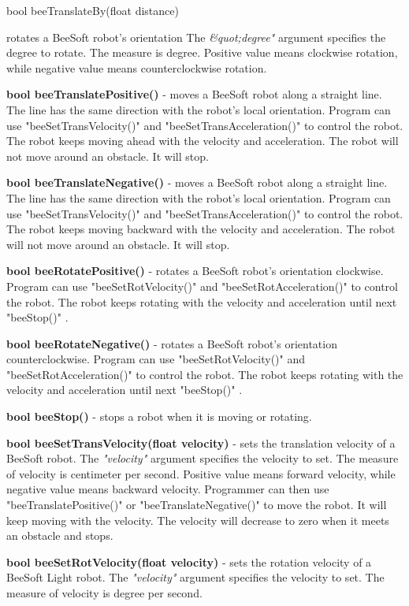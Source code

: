 {\begin{enumerate}{\bf \item bool
    beeTranslateBy(float distance)}
  rotates a BeeSoft robot's orientation The {\it \&quot;degree"}
  argument specifies the degree to rotate. The measure is degree.
  Positive value means clockwise rotation, while negative value means
  counterclockwise rotation.\item {\bf bool beeTranslatePositive()} -
  moves a BeeSoft robot along a straight line.  The line has the same
  direction with the robot's local orientation. Program can use
  "beeSetTransVelocity()" and "beeSetTransAcceleration()" to control
  the robot. The robot keeps moving ahead with the velocity and
  acceleration. The robot will not move around an obstacle. It will
  stop.\item {\bf bool beeTranslateNegative()} - moves a BeeSoft robot
  along a straight line.  The line has the same direction with the
  robot's local orientation. Program can use "beeSetTransVelocity()"
  and "beeSetTransAcceleration()" to control the robot. The robot
  keeps moving backward with the velocity and acceleration. The robot
  will not move around an obstacle. It will stop.\item {\bf bool
    beeRotatePositive()} - rotates a BeeSoft robot's orientation
  clockwise. Program can use "beeSetRotVelocity()" and
  "beeSetRotAcceleration()" to control the robot. The robot keeps
  rotating with the velocity and acceleration until next "beeStop()"
  .\item {\bf bool beeRotateNegative()} - rotates a BeeSoft robot's
  orientation counterclockwise. Program can use "beeSetRotVelocity()"
  and "beeSetRotAcceleration()" to control the robot. The robot keeps
  rotating with the velocity and acceleration until next "beeStop()"
  .\item {\bf bool beeStop()} - stops a robot when it is moving or
  rotating.\item {\bf bool beeSetTransVelocity(float velocity)} - sets
  the translation velocity of a BeeSoft robot.  The {\it "velocity"}
  argument specifies the velocity to set. The measure of velocity is
  centimeter per second. Positive value means forward velocity, while
  negative value means backward velocity. Programmer can then use
  "beeTranslatePositive()" or "beeTranslateNegative()" to move the
  robot. It will keep moving with the velocity. The velocity will
  decrease to zero when it meets an obstacle and stops.\item {\bf bool
    beeSetRotVelocity(float velocity)} - sets the rotation velocity of
  a BeeSoft Light robot.  The {\it "velocity"} argument specifies the
  velocity to set. The measure of velocity is degree per second.

\end{enumerate}}
